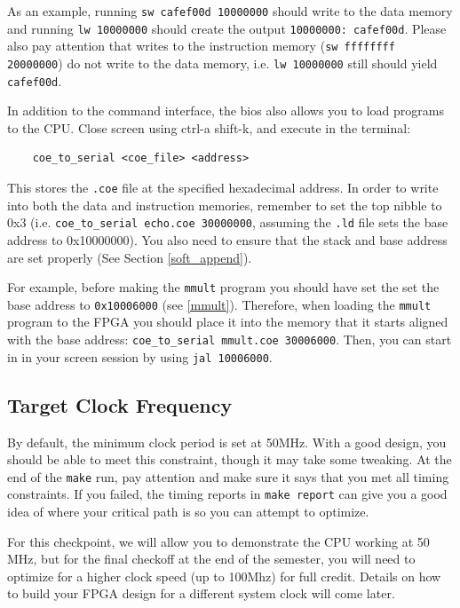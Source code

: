\documentclass[11pt]{article}
\begin{document}
As an example, running \verb|sw cafef00d 10000000| should write to the data memory and running \verb|lw 10000000| should create the output \verb|10000000: cafef00d|. Please also pay attention that writes to the instruction memory (\verb|sw ffffffff 20000000|) do not write to the data memory, i.e. \verb|lw 10000000| still should yield \verb|cafef00d|.

In addition to the command interface, the bios also allows you to load programs to the CPU. Close screen using ctrl-a shift-k, and execute in the terminal:
\begin{verbatim}
    coe_to_serial <coe_file> <address>
\end{verbatim}

This stores the \verb|.coe| file at the specified hexadecimal address. In order to write into both the data and instruction memories, remember to set the top nibble to 0x3 (i.e. \verb|coe_to_serial echo.coe 30000000|, assuming the \verb|.ld| file sets the base address to 0x10000000). You also need to ensure that the stack and base address are set properly (See Section \ref{soft_append}).

For example, before making the \verb|mmult| program you should have set the set the base address to \verb|0x10006000| (see \ref{mmult}). Therefore, when loading the \verb|mmult| program to the FPGA you should place it into the memory that it starts aligned with the base address: \verb|coe_to_serial mmult.coe 30006000|. Then, you can start in in your screen session by using \verb|jal 10006000|.

\subsection{Target Clock Frequency}
By default, the minimum clock period is set at 50MHz. With a good design, you should be able to meet this constraint, though it may take some tweaking. At the end of the \verb|make| run, pay attention and make sure it says that you met all timing constraints. If you failed, the timing reports in \verb|make report| can give you a good idea of where your critical path is so you can attempt to optimize.

For this checkpoint, we will allow you to demonstrate the CPU working at 50 MHz, but for the final checkoff at the end of the semester, you will need to optimize for a higher clock speed (up to 100Mhz) for full credit. Details on how to build your FPGA design for a different system clock will come later.
\end{document}
